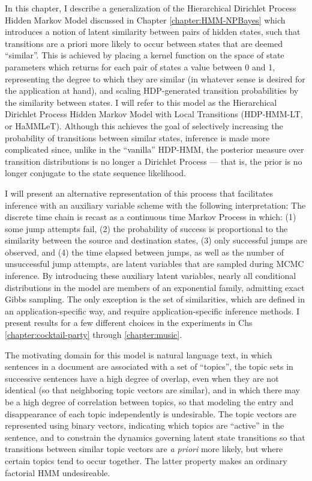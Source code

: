 In this chapter, 
I describe a generalization of the Hierarchical Dirichlet Process
Hidden Markov Model  \citet{teh2006hierarchical} discussed in Chapter \ref{chapter:HMM-NPBayes}
which introduces a notion of latent similarity between pairs of hidden
states, such that transitions are a priori more likely to occur between states
that are deemed ``similar''.  This is achieved by
placing a kernel function on the space of state parameters which
returns for each pair of states a value between 0 and 1, representing
the degree to which they are similar (in whatever sense is desired for
the application at hand), and
scaling HDP-generated transition probabilities by the similarity between states.  
I will refer to this model as the Hierarchical Dirichlet Process Hidden Markov Model with Local
Transitions (HDP-HMM-LT, or HaMMLeT).  Although this achieves the goal of selectively increasing the
probability of transitions between similar states, inference is made
more complicated since, unlike in the ``vanilla'' HDP-HMM, 
the posterior measure over transition
distributions is no longer a Dirichlet Process --- that is, the prior
is no longer conjugate to the state sequence likelihood.  

I will present an alternative representation of this process that facilitates
inference with an auxiliary variable scheme with the following
interpretation: The discrete time chain is recast as a continuous time Markov Process
in which: (1) some jump attempts fail, (2) the probability of success is
proportional to the similarity between the source and destination
states, (3) only successful jumps are observed,
and (4) the time elapsed between jumps, as well as the number of
unsuccessful jump attempts, are latent variables that are sampled
during MCMC inference.  By introducing these auxiliary latent
variables, nearly all
conditional distributions in the model are members of an exponential
family, admitting exact Gibbs sampling.  The only exception
is the set of similarities, which are defined in an
application-specific way, and require application-specific inference methods.
I present results for a few different choices in the experiments in
Chs \ref{chapter:cocktail-party} through \ref{chapter:music}.

The motivating domain for this model is natural language text, in
which sentences in a document are associated with a set of ``topics'',
the topic sets in successive sentences have a high
degree of overlap, even when they are not identical (so that
neighboring topic vectors are similar), and in which there may be a
high degree of correlation between topics, so that modeling the entry
and disappearance of each topic independently is undesirable.  
The topic vectors are represented using binary vectors, indicating which
topics are ``active'' in the sentence, and to constrain the dynamics 
governing latent state transitions so that
transitions between similar topic vectors are {\it a priori} more
likely, but where certain topics tend to occur together.  The latter
property makes an ordinary factorial HMM undesireable.  

